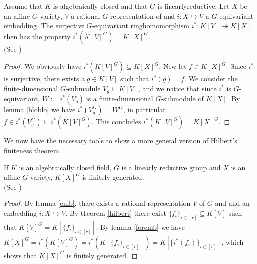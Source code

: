 \begin{lemma}\label{foremb}
  Assume that $K$ is algebraically closed and that $G$ is linearly\linebreak reductive.
  Let $X$ be an affine $G$-variety, $V$ a rational $G$-representation of and $i \colon X \hookrightarrow V$ a $G$-equivariant embedding.
  The surjective $G$-equivariant ring\linebreak homomorphism $i^\ast \colon K[V] \twoheadrightarrow K[X]$ then has the property $i^\ast (K[V]^G) = K[X]^G$. \\
  (See \cite[2.2.9]{DK15})
\end{lemma}

\begin{proof}
  We obviously have $i^\ast(K[V]^G) \subseteq K[X]^G$.
  Now let $f \in K[X]^G$.
  Since $i^\ast$ is surjective, there exists a $g \in K[V]$ such that $i^\ast (g) = f$.
  We consider the finite-dimensional $G$-submodule $V_g \subseteq K[V]$, and we notice that since $i^\ast$ is $G$-equivariant, $W := i^\ast (V_g)$ is a finite-dimensional $G$-submodule of $K[X]$.  %
  By lemma \ref{bloblo} we have $i^\ast (V_g^G) = W^G$, in particular $f \in i^\ast (V_g^G) \subseteq i^\ast(K[V]^G)$. %
  This concludes $i^\ast(K[V]^G) = K[X]^G$.
\end{proof}

We now have the necessary tools to show a more general version of Hilbert's finiteness theorem.

\begin{theorem}\label{hil2}
  If $K$ is an algebraically closed field, $G$ is a linearly reductive group and $X$ is an affine $G$-variety, $K[X]^G$ is finitely generated.  \\
  (See \cite[2.2.11]{DK15})
\end{theorem}

\begin{proof}
  By lemma \ref{emb}, there exists a rational representation $V$ of $G$ and and an embedding $i \colon X \hookrightarrow V$.
  By theorem \ref{hilbert} there exist $ \{f_i\}_{i \in [r]} \subseteq K[V]$ such that $K[V]^G = K[\{f_i\}_{i \in [r]}]$.
  By lemma \ref{foremb} we have $K[X]^G = i^\ast (K[V]^G) = i^\ast (K[\{f_i\}_{i \in [r]}]) = K[\{i^\ast(f_i)\}_{i \in [r]}]$, which shows that $K[X]^G$ is finitely generated.
\end{proof}

